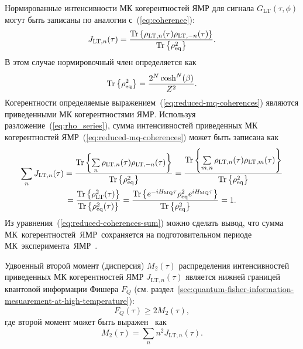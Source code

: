 Нормированные интенсивности МК когерентностей ЯМР для сигнала $G_\mathrm{LT}(\tau, \phi)$
могут быть записаны по аналогии с~(\ref{eq:coherence}):
%
\begin{equation}\label{eq:reduced-mq-coherences}
    J_{\mathrm{LT}, n}(\tau) =
    \frac{\mathrm{Tr} \left\{ 
        \rho_{\mathrm{LT},n}(\tau)
        \rho_{\mathrm{LT}, -n}(\tau)
     \right\}}
    {\mathrm{Tr} \left\{ \rho^2_\mathrm{eq} \right\}}.
\end{equation}
%
В этом случае нормировочный член определяется как
%
\begin{equation}\label{eq:j_lt_norm}
  \mathrm{Tr} \left\{ \rho^2_\mathrm{eq} \right\} =
    \frac{2^N \cosh^N(\beta)}{Z^2}.
\end{equation}
Когерентности определяемые выражением~(\ref{eq:reduced-mq-coherences})
являются приведенными МК когерентностями ЯМР.
%
Используя разложение~(\ref{eq:rho_series}),
сумма интенсивностей приведенных МК когерентностей ЯМР~(\ref{eq:reduced-mq-coherences}) может быть записана как
%
\begin{multline}\label{eq:reduced-coherences-sum}
  \sum\limits_{n} J_{\mathrm{LT}, n}(\tau)
  = \dfrac{
    \mathrm{Tr} \left\{ 
      \sum\limits_{n}
      \rho_{\mathrm{LT}, n}(\tau)
      \rho_{\mathrm{LT},-n}(\tau) \right\}
    }{
    \mathrm{Tr} \left\{ \rho^2_\mathrm{eq}  \right\}
  }
  = \dfrac{
    \mathrm{Tr} \left\{ 
      \sum\limits_{m,n}
      \rho_{\mathrm{LT}, n}(\tau)
      \rho_{\mathrm{LT}, m}(\tau)
     \right\}}{
    \mathrm{Tr} \left\{ \rho^2_\mathrm{eq} \right\}
  }
  \\
  = \dfrac{
    \mathrm{Tr} \left\{ \rho_\mathrm{LT}^2(\tau) \right\}
  }{
    \mathrm{Tr} \left\{ \rho^2_\mathrm{eq}(\tau) \right\}
  }
  = \dfrac{
    \mathrm{Tr} \left\{ 
      e^{-i H_\mathrm{MQ} \tau}
      \rho^{2}_\mathrm{eq}
      e^{i H_\mathrm{MQ} \tau}
     \right\}
  }{
    \mathrm{Tr} \left\{  \rho^2_\mathrm{eq} \right\}
  }
  = 1.
\end{multline}
%
Из уравнения~(\ref{eq:reduced-coherences-sum}) можно сделать вывод, что сумма МК~когерентностей~ЯМР~сохраняется на подготовительном периоде МК~эксперимента~ЯМР~\cite{Baum1985}.


Удвоенный второй момент (дисперсия) $M_2(\tau)$ распределения интенсивностей приведенных МК когерентностей ЯМР $J_{\mathrm{LT}, n} (\tau)$
является нижней границей квантовой информации Фишера $F_{Q}$
(см. раздел~\ref{sec:quantum-fisher-information-mesuarement-at-high-temperature}):
\begin{equation}\label{eq:fisher-low-bound}
  F_{Q}(\tau) \geq 2M_2(\tau),
\end{equation}
где второй момент может быть выражен~\cite{Khitrin1997} как
%
\begin{equation}\label{eq:m2-via-coherences}
  M_2(\tau) = \sum\limits_n n^2 J_{\mathrm{LT}, n} (\tau).
\end{equation}

